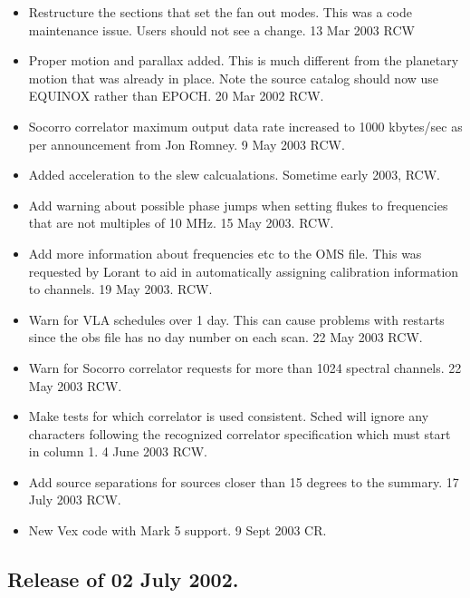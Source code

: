 \documentclass{report}
\begin{document}
\begin{itemize}
\item Restructure the sections that set the fan out modes.  This was
a code maintenance issue.  Users should not see a change.  13 Mar 2003 RCW

\item Proper motion and parallax added.  This is much different from the
planetary motion that was already in place.  Note the source catalog
should now use EQUINOX rather than EPOCH.  20 Mar 2002 RCW.

\item Socorro correlator maximum output data rate increased to
1000 kbytes/sec as per announcement from Jon Romney.  9 May 2003 RCW.

\item Added acceleration to the slew calcualations. Sometime early 2003,
RCW.

\item Add warning about possible phase jumps when setting flukes to
frequencies that are not multiples of 10 MHz.  15 May 2003. RCW.

\item Add more information about frequencies etc to the OMS file.  This
was requested by Lorant to aid in automatically assigning calibration
information to channels.  19 May 2003.  RCW.

\item Warn for VLA schedules over 1 day.  This can cause problems with
restarts since the obs file has no day number on each scan.  22 May 2003
RCW.

\item Warn for Socorro correlator requests for more than 1024 spectral
channels.   22 May 2003  RCW.

\item Make tests for which correlator is used consistent.  Sched will
ignore any characters following the recognized correlator specification
which must start in column 1.  4 June 2003 RCW.

\item Add source separations for sources closer than 15 degrees to the
summary.  17 July 2003 RCW.

\item New Vex code with Mark 5 support.  9 Sept 2003 CR.

\end{itemize}


\subsection{\label{SSSEC:15MAY2002}Release of 02 July 2002.}
\end{document}
